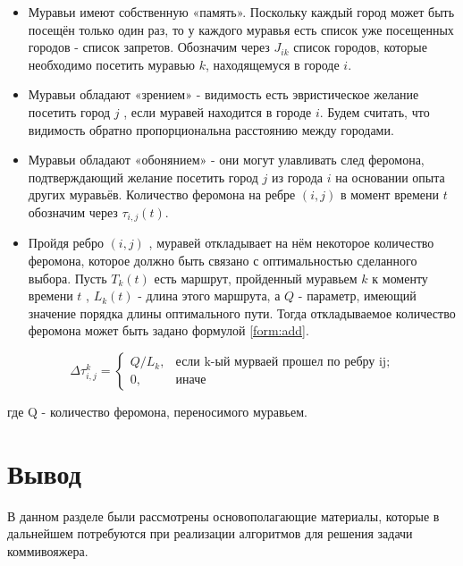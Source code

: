 \documentclass[12pt,a4paper]{report}
\begin{document}
\begin{itemize}
	\item Муравьи имеют собственную «память».
	Поскольку каждый город может быть посещён только один раз, то у каждого муравья есть список уже посещенных городов - список запретов.
	Обозначим через $J_{ik}$ список городов, которые необходимо посетить муравью $k$, находящемуся в городе $i$.
	\item Муравьи обладают «зрением» - видимость есть эвристическое желание посетить город $j$ , если муравей находится в городе $i$.
	Будем считать, что видимость обратно пропорциональна расстоянию между городами.
	\item Муравьи обладают «обонянием» - они могут улавливать след феромона, подтверждающий желание посетить город $j$ из города $i$ на основании опыта других муравьёв.
	Количество феромона на ребре $(i,j)$ в момент времени $t$ обозначим через  $\tau_{i,j} (t)$.
	\item Пройдя ребро $(i,j)$ , муравей откладывает на нём некоторое количество феромона, которое должно быть связано с оптимальностью сделанного выбора.
	Пусть $T _{k} (t)$ есть маршрут, пройденный муравьем $k$ к моменту времени $t$ , $L _{k} (t)$ - длина этого маршрута, а $Q$ - параметр,
	имеющий значение порядка длины оптимального пути. Тогда откладываемое количество феромона может быть задано формулой \ref{form:add}.
	
\end{itemize}



\begin{equation}\label{form:add}
	{\displaystyle \Delta \tau_{i,j}^k={\begin{cases}Q/L_{k}, & {\mbox{если k-ый мурваей прошел по ребру ij;}}\\0,&{\mbox{иначе}}\end{cases}}}
\end{equation}

где Q - количество феромона, переносимого муравьем.

	
\newpage
\section*{Вывод}


В данном разделе были рассмотрены основополагающие материалы,
которые в дальнейшем потребуются при реализации алгоритмов для решения задачи коммивояжера.	
	
\end{document}
